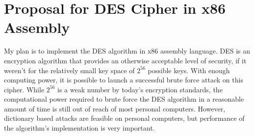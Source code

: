 \documentclass[12pt]{article}
\begin{document}
\section*{Proposal for DES Cipher in x86 Assembly}
My plan is to implement the DES algorithm in x86 assembly language. DES is an encryption algorithm that provides an otherwise acceptable level of security, if it weren't for the relatively small key space of $2^{56}$ possible keys. With enough computing power, it is possible to launch a successful brute force attack on this cipher. While $2^{56}$ is a weak number by today's encryption standards, the computational power required to brute force the DES algorithm in a reasonable amount of time is still out of reach of most personal computers. However, dictionary based attacks are feasible on personal computers, but performance of the algorithm's implementation is very important. 
\end{document}

